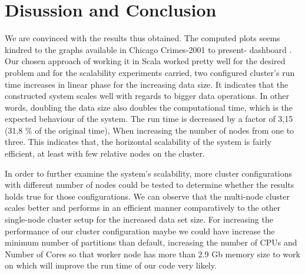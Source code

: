 \section{Disussion and Conclusion}


We are convinced with the results thus obtained. The computed plots seems kindred to the graphs available in Chicago Crimes-2001 to present- dashboard \cite{chicago_location}.
\bigbreak
Our chosen approach of working it in Scala worked pretty well for the desired problem and for the scalability experiments carried, two configured cluster's run time  increases in linear phase for the increasing data size. It indicates that the constructed system scales well with regards to bigger data operations. In other words, doubling the data size also doubles the computational time, which is the expected behaviour of the system. The run time is decreased by a factor of 3,15 (31,8 \% of the original time), When increasing the number of nodes from one to three. This indicates that, the horizontal scalability of the system is fairly efficient, at least with few relative nodes on the cluster.

\bigbreak
In order to further examine the system's scalability, more cluster configurations with different number of nodes could be tested to determine whether the results holds true for those configurations. We can observe that the multi-node cluster scales better and performs in an efficient manner comparatively to the other single-node cluster setup for the increased data set size. For increasing the performance of our cluster configuration maybe we could have increase the minimum number of partitions than default, increasing the number of CPUs and Number of Cores so that worker node has more than 2.9 Gb memory size to work on which will improve the run time of our code very likely.
